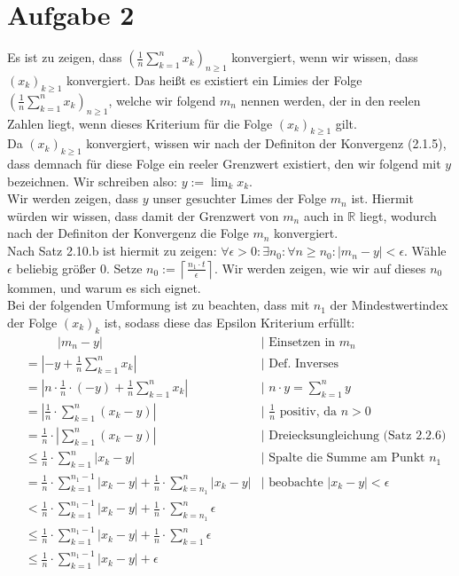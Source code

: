 \documentclass[12pt, a4paper]{article}
\newcommand*{\puffer}{\text{ }\text{ }\text{ }\text{ }}
\begin{document}
\section*{Aufgabe 2}
Es ist zu zeigen, dass $\left(\frac{1}{n}\sum_{k = 1}^{n}x_k\right)_{n \ge 1}$ konvergiert, wenn wir wissen, dass $(x_k)_{k \ge 1}$ konvergiert. Das heißt es existiert ein Limies der Folge $\left(\frac{1}{n}\sum_{k = 1}^{n}x_k\right)_{n \ge 1}$,
welche wir folgend $m_n$ nennen werden, der in den reelen Zahlen liegt, wenn dieses Kriterium für die Folge $(x_k)_{k \ge 1}$ gilt. \\
Da $(x_k)_{k \ge 1}$ konvergiert, wissen wir nach der Definiton der Konvergenz (2.1.5), dass demnach für diese Folge ein reeler Grenzwert existiert, den wir folgend mit $y$ bezeichnen. Wir schreiben also: $y := \lim_{k}x_k$. \\
Wir werden zeigen, dass $y$ unser gesuchter Limes der Folge $m_n$ ist. Hiermit würden wir wissen, dass damit der Grenzwert von $m_n$ auch in $\mathbb R$ liegt, wodurch nach der Definiton der Konvergenz die Folge $m_n$ konvergiert. \\
Nach Satz 2.10.b ist hiermit zu zeigen: $\forall \epsilon > 0: \exists n_0: \forall n \ge n_0: |m_n - y| < \epsilon$.
Wähle $\epsilon$ beliebig größer $0$. Setze $n_0 := \left\lceil\frac{n_1 \cdot t}{\epsilon}\right\rceil$. Wir werden zeigen, wie wir auf dieses $n_0$ kommen, und warum es sich eignet. \\
Bei der folgenden Umformung ist zu beachten, dass mit $n_1$ der Mindestwertindex der Folge $(x_k)_k$ ist, sodass diese das Epsilon Kriterium erfüllt:
\vspace{-0.5cm}
\begin{align*}
    & \puffer |m_n - y| & \text{| Einsetzen in $m_n$} \\
    & = \left|-y + \frac{1}{n} \sum_{k=1}^{n}x_k\right| &  \text{| Def. Inverses} \\
    & = \left|n \cdot \frac{1}{n} \cdot (-y) + \frac{1}{n} \sum_{k=1}^{n}x_k\right| & \text{| }n \cdot y = \sum_{k=1}^{n} y\\
    & = \left|\frac{1}{n} \cdot \sum_{k=1}^{n}(x_k - y)\right| & \text{| $\frac{1}{n}$ positiv, da $n > 0$} \\
    & = \frac{1}{n} \cdot \left| \sum_{k=1}^{n}(x_k - y)\right| & \text{| Dreiecksungleichung (Satz 2.2.6)} \\
    & \le \frac{1}{n} \cdot \sum_{k=1}^{n}|x_k - y| & \text{| Spalte die Summe am Punkt $n_1$} \\
    & = \frac{1}{n} \cdot \sum_{k=1}^{n_1 -1 }|x_k - y| + \frac{1}{n} \cdot \sum_{k=n_1}^{n}|x_k - y| & \text{| beobachte $|x_k - y| < \epsilon$} \\
    & < \frac{1}{n} \cdot \sum_{k=1}^{n_1 -1 }|x_k - y| + \frac{1}{n} \cdot \sum_{k=n_1}^{n}\epsilon & \\
    & \le \frac{1}{n} \cdot \sum_{k=1}^{n_1 -1 }|x_k - y| + \frac{1}{n} \cdot \sum_{k=1}^{n}\epsilon & \\
    & \le \frac{1}{n} \cdot \sum_{k=1}^{n_1 -1 }|x_k - y| + \epsilon &
\end{align*}
\end{document}
